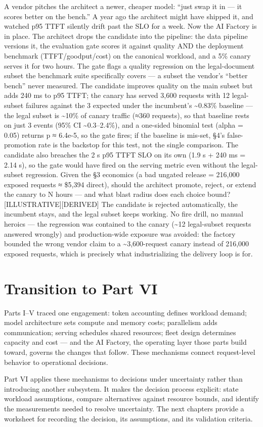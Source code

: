 A vendor pitches the architect a newer, cheaper model: ``just swap it in
--- it scores better on the bench.'' A year ago the architect might have
shipped it, and watched p95 TTFT silently drift past the SLO for a week.
Now the AI Factory is in place. The architect drops the candidate into
the pipeline: the data pipeline versions it, the evaluation gate scores
it against quality AND the deployment benchmark (TTFT/goodput/cost) on
the canonical workload, and a 5\% canary serves it for two hours. The
gate flags a quality regression on the legal-document subset the
benchmark suite specifically covers --- a subset the vendor's ``better
bench'' never measured. The candidate improves quality on the main
subset but adds 240 ms to p95 TTFT; the canary has served 3,600 requests
with 12 legal-subset failures against the 3 expected under the
incumbent's \textasciitilde0.83\% baseline --- the legal subset is
\textasciitilde10\% of canary traffic (≈360 requests), so that baseline
rests on just 3 events (95\% CI \textasciitilde0.3--2.4\%), and a
one-sided binomial test (alpha = 0.05) returns p ≈ 6.4e-5, so the gate
fires; if the baseline is mis-set, §4's false-promotion rate is the
backstop for this test, not the single comparison. The candidate also
breaches the 2 s p95 TTFT SLO on its own (1.9 s + 240 ms = 2.14 s), so
the gate would have fired on the serving metric even without the
legal-subset regression. Given the §3 economics (a bad ungated release =
216,000 exposed requests ≈ \$5,394 direct), should the architect
promote, reject, or extend the canary to N hours --- and what blast
radius does each choice bound? \mbox{{[}ILLUSTRATIVE{]}}\hspace{0pt}\mbox{{[}DERIVED{]}} The
candidate is rejected automatically, the incumbent stays, and the legal
subset keeps working. No fire drill, no manual heroics --- the
regression was contained to the canary (\textasciitilde12 legal-subset
requests answered wrongly) and production-wide exposure was avoided: the
factory bounded the wrong vendor claim to a \textasciitilde3,600-request
canary instead of 216,000 exposed requests, which is precisely what
industrializing the delivery loop is for.

\section{Transition to Part VI}\label{transition-to-part-vi}

Parts I--V traced one engagement: token accounting defines workload
demand; model architecture sets compute and memory costs; parallelism
adds communication; serving schedules shared resources; fleet design
determines capacity and cost --- and the AI Factory, the operating layer
those parts build toward, governs the changes that follow. These
mechanisms connect request-level behavior to operational decisions.

Part VI applies these mechanisms to decisions under uncertainty rather
than introducing another subsystem. It makes the decision process
explicit: state workload assumptions, compare alternatives against
resource bounds, and identify the measurements needed to resolve
uncertainty. The next chapters provide a worksheet for recording the
decision, its assumptions, and its validation criteria.
